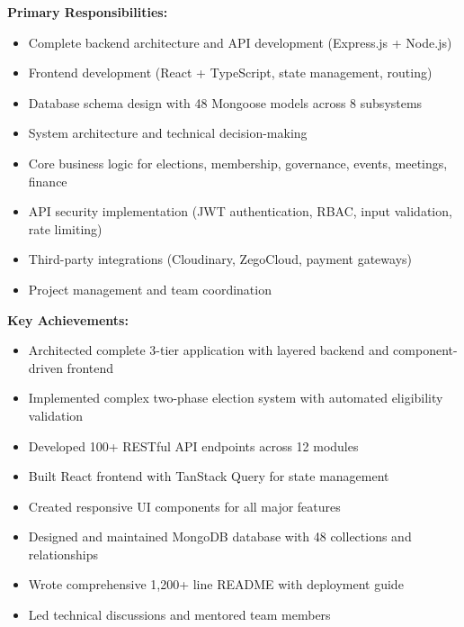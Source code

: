 \documentclass[12pt,a4paper]{article}
\begin{document}
\begin{tcolorbox}[colback=LightTeal, colframe=Teal, title=\textbf{Md. Abu Horaira (Roll: 26) — Full-Stack Developer \& Project Lead}, fonttitle=\bfseries\large]

\textbf{Primary Responsibilities:}
\begin{itemize}[noitemsep]
  \item Complete backend architecture and API development (Express.js + Node.js)
  \item Frontend development (React + TypeScript, state management, routing)
  \item Database schema design with 48 Mongoose models across 8 subsystems
  \item System architecture and technical decision-making
  \item Core business logic for elections, membership, governance, events, meetings, finance
  \item API security implementation (JWT authentication, RBAC, input validation, rate limiting)
  \item Third-party integrations (Cloudinary, ZegoCloud, payment gateways)
  \item Project management and team coordination
\end{itemize}

\textbf{Key Achievements:}
\begin{itemize}[noitemsep]
  \item Architected complete 3-tier application with layered backend and component-driven frontend
  \item Implemented complex two-phase election system with automated eligibility validation
  \item Developed 100+ RESTful API endpoints across 12 modules
  \item Built React frontend with TanStack Query for state management
  \item Created responsive UI components for all major features
  \item Designed and maintained MongoDB database with 48 collections and relationships
  \item Wrote comprehensive 1,200+ line README with deployment guide
  \item Led technical discussions and mentored team members
\end{itemize}
\end{tcolorbox}
\end{document}
